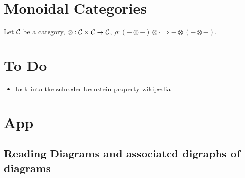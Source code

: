 \documentclass{book}
\begin{document}
	
	
	
	
	
	
	
	
	
	
	
	

	
	
	
	
	
	
	
	
	
	
	
	
	
	
	
	
	\chapter{Monoidal Categories}
	
	\begin{defn}
		Let $\mathcal{C}$ be a category, $\otimes : \mathcal{C} \times \mathcal{C} \rightarrow \mathcal{C}$, $\rho: (- \otimes -) \otimes \cdot \Rightarrow - \otimes (- \otimes -)$.
	\end{defn}
	
	
	
	
	
	
	
	
	
	
	
	
	
	
	
	
	
	\chapter{To Do}
	
	
	\begin{itemize}
		\item look into the schroder bernstein property \href{https://en.wikipedia.org/wiki/Schr%C3%B6der%E2%80%93Bernstein_property}{wikipedia}
	\end{itemize}
	
	
	
	
	
	
	
	
	
	
	
	
	\appendix
	\chapter{App}
	
	\section{Reading Diagrams and associated digraphs of diagrams}
	
\end{document}
